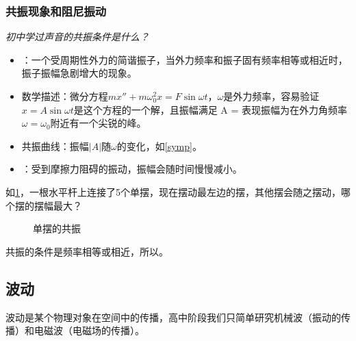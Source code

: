 \documentclass[a4paper,9pt]{ctexart}
\begin{document}
\subsubsection{共振现象和阻尼振动}
\emph{初中学过声音的共振条件是什么？}
\begin{itemize}
\item
{}：一个受周期性外力的简谐振子，当外力频率和振子固有频率相等或相近时，振子振幅急剧增大的现象。
\item
数学描述：微分方程$mx'' + m\omega_0^2 x = F\sin \omega t$，$\omega$是外力频率，容易验证$x = A\sin \omega t$是这个方程的一个解，且振幅满足
\beq
A = 
\eeq
表现振幅为在外力角频率$\omega = \omega_0$附近有一个尖锐的峰。
\item
共振曲线：振幅$|A|$随$\omega$的变化，如\cref{symp}。
\item
{}：受到摩擦力阻碍的振动，振幅会随时间慢慢减小。
\end{itemize}
\begin{eg}
如\cref{compen}，一根水平杆上连接了5个单摆，现在摆动最左边的摆，其他摆会随之摆动，哪个摆的摆幅最大？
\end{eg}
\begin{figure}[H]
\centering
{}
\caption{单摆的共振\label{compen}}
\end{figure}
\begin{ans}
共振的条件是频率相等或相近，所以\uline{\hspace{3cm}}。
\end{ans}

\subsection{波动}
波动是某个物理对象在空间中的传播，高中阶段我们只简单研究机械波（振动的传播）和电磁波（电磁场的传播）。
\end{document}
